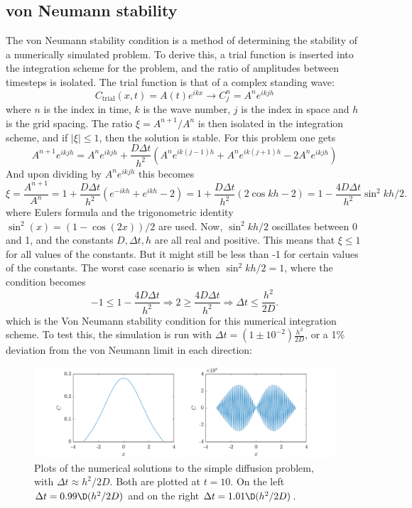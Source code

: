 \documentclass[a4paper,10pt]{article} 	%
\numberwithin{equation}{section}
\begin{document}
	\subsection{von Neumann stability}
	The von Neumann stability condition is a method of determining the stability of a numerically simulated problem. To derive this, a trial function is inserted into the integration scheme for the problem, and the ratio of amplitudes between timesteps is isolated. The trial function is that of a complex standing wave:
	\begin{equation}\label{key}
		C_{\text{trial}}(x,t) = A(t) e^{ikx} \to C_j^n = A^n e^{ikjh}
	\end{equation}
	where $ n $ is the index in time, $ k $ is the wave number, $ j $ is the index in space and $ h $ is the grid spacing. The ratio $ \xi = A^{n+1}/A^{n} $ is then isolated in the integration scheme, and if $ |\xi| \leq 1 $, then the solution is stable. For this problem one gets
	\begin{equation}\label{key}
		A^{n+1} e^{ikjh} = A^n e^{ikjh} + \frac{D \Delta t}{h^2} (A^n e^{ik(j-1)h}+A^n e^{ik(j+1)h}-2A^n e^{ikjh})
	\end{equation}
	And upon dividing by $ A^n e^{ikjh} $ this becomes
	\begin{equation}\label{key}
		\xi = \frac{A^{n+1}}{A^n} = 1 + \frac{D \Delta t}{h^2} (e^{-ikh}+e^{ikh}-2) = 1 + \frac{D \Delta t}{h^2} (2\cos kh -2) = 1 - \frac{4D \Delta t}{h^2} \sin^2 kh/2.
	\end{equation}
	where Eulers formula and the trigonometric identity $ \sin^2(x) = (1-\cos(2x))/2 $ are used. Now, $ \sin^2 kh/2 $ oscillates between 0 and 1, and the constants $ D,\Delta t,h$ are all real and positive. This means that $ \xi \leq 1 $ for all values of the constants. But it might still be less than -1 for certain values of the constants. The worst case scenario is when $ \sin^2 kh/2 = 1 $, where the condition becomes
	\begin{equation}\label{key}
		-1 \leq 1-\frac{4D\Delta t}{h^2} \Rightarrow 2 \geq \frac{4D\Delta t}{h^2} \Rightarrow \Delta t \leq \frac{h^2}{2D}.
	\end{equation}
	which is the Von Neumann stability condition for this numerical integration scheme. To test this, the simulation is run with $ \Delta t = (1\pm 10^{-2}) \frac{h^2}{2D}$, or a 1\% deviation from the von Neumann limit in each direction:
	\begin{figure}[H]
		\centering
		\includegraphics[width=\linewidth]{vonNeumann1.pdf}
		\caption{Plots of the numerical solutions to the simple diffusion problem, with $ \Delta t \approx h^2/2D $. Both are plotted at $ t = 10 $. On the left $ \Delta t = 0.99\D(h^2/2D) $ and on the right $ \Delta t = 1.01\D(h^2/2D) $.}
		\label{fig:von1}
	\end{figure}
\end{document}
